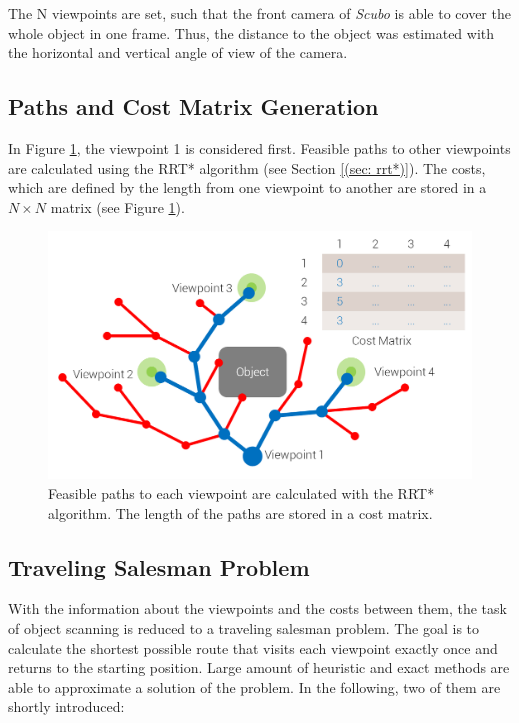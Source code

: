 The N viewpoints are set, such that the front camera of \textit{Scubo} is able to cover the whole object in one frame. Thus, the distance to the object was estimated with the horizontal and vertical angle of view of the camera. 

\subsection{Paths and Cost Matrix Generation}

In Figure \ref{pics:viewpoints_paths}, the viewpoint 1 is considered first. Feasible paths to other viewpoints are calculated using the RRT* algorithm (see Section \ref{(sec: rrt*)}). The costs, which are defined by the length from one viewpoint to another are stored in a $N\times N$ matrix (see Figure \ref{pics:viewpoints_paths}). 

\begin{figure} [h]
	\centering
	\includegraphics[width=1\textwidth]{images/cost_matrix_and_paths.png}
	\caption{Feasible paths to each viewpoint are calculated with the RRT* algorithm. The length of the paths are stored in a cost matrix.}
	\label{pics:viewpoints_paths}
\end{figure}

\subsection{Traveling Salesman Problem}

With the information about the viewpoints and the costs between them, the task of object scanning is reduced to a traveling salesman problem. The goal is to calculate the shortest possible route that visits each viewpoint exactly once and returns to the starting position. Large amount of heuristic and exact methods are able to approximate a solution of the problem. In the following, two of them are shortly introduced:

